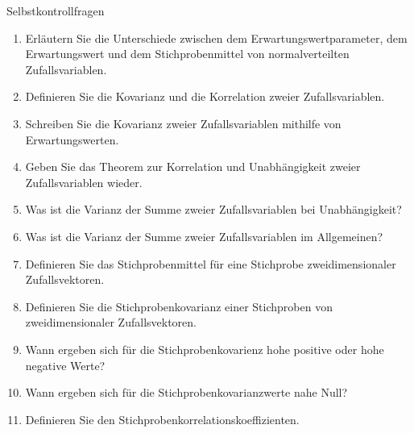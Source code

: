 \documentclass[
  8pt,
  ignorenonframetext,
]{beamer}
\begin{document}
\begin{frame}{Selbstkontrollfragen}
\protect\hypertarget{selbstkontrollfragen-1}{}
\footnotesize
\begin{enumerate}
\justifying
\setcounter{enumi}{12}
\item Erläutern Sie die Unterschiede zwischen dem Erwartungswertparameter, dem Erwartungswert und dem Stichprobenmittel von normalverteilten Zufallsvariablen.
\item Definieren Sie die Kovarianz und die Korrelation zweier Zufallsvariablen.
\item Schreiben Sie die Kovarianz zweier Zufallsvariablen mithilfe von Erwartungswerten.
\item Geben Sie das Theorem zur Korrelation und Unabhängigkeit zweier Zufallsvariablen wieder.
\item Was ist die Varianz der Summe zweier Zufallsvariablen bei Unabhängigkeit?
\item Was ist die Varianz der Summe zweier Zufallsvariablen im Allgemeinen?
\item Definieren Sie das Stichprobenmittel für eine Stichprobe zweidimensionaler Zufallsvektoren.
\item Definieren Sie die Stichprobenkovarianz einer Stichproben von zweidimensionaler Zufallsvektoren.
\item Wann ergeben sich für die Stichprobenkovarienz hohe positive oder hohe negative Werte?
\item Wann ergeben sich für die Stichprobenkovarianzwerte nahe Null?
\item Definieren Sie den Stichprobenkorrelationskoeffizienten.
\end{enumerate}
\end{frame}
\end{document}

